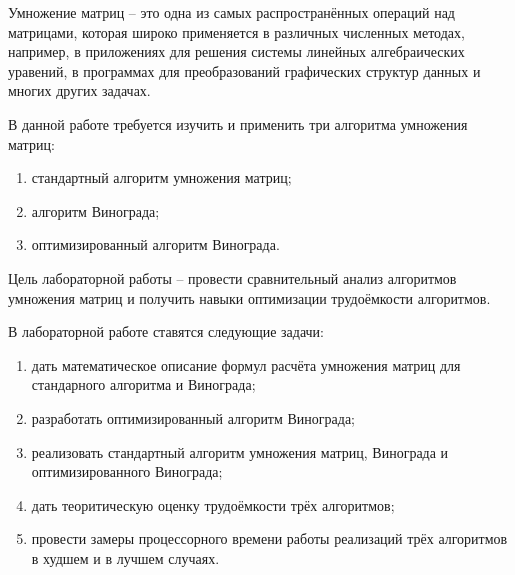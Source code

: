 \Introduction    
    Умножение матриц -- это одна из самых распространённых операций над матрицами,
    которая широко применяется в различных численных методах, например, в приложениях 
    для решения системы линейных алгебраических уравений, в программах для 
    преобразований графических структур данных и многих других задачах.

    В данной работе требуется изучить и применить три алгоритма умножения матриц:
    \begin{enumerate}
        \item стандартный алгоритм умножения матриц;
        \item алгоритм Винограда;
        \item оптимизированный алгоритм Винограда.
    \end{enumerate}

    Цель лабораторной работы -- провести сравнительный анализ алгоритмов умножения матриц
    и получить навыки оптимизации трудоёмкости алгоритмов.

    В лабораторной работе ставятся следующие задачи:
     \begin{enumerate}
         \item дать математическое описание формул расчёта умножения матриц для стандарного алгоритма и Винограда;
         \item разработать оптимизированный алгоритм Винограда;
         \item реализовать стандартный алгоритм умножения матриц, Винограда и оптимизированного Винограда;
         \item дать теоритическую оценку трудоёмкости трёх алгоритмов;
         \item провести замеры процессорного времени работы реализаций трёх алгоритмов в худшем и в лучшем случаях.
     \end{enumerate}

\newpage